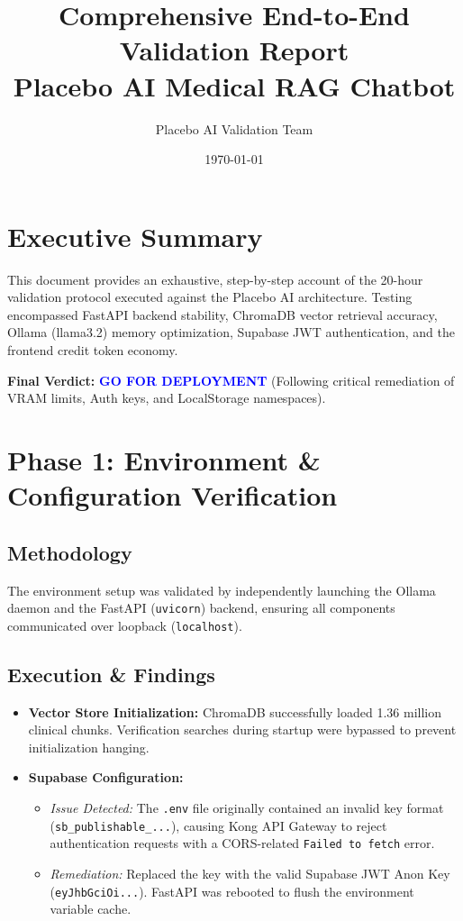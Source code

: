 \documentclass[11pt, a4paper]{article}
\title{\textbf{Comprehensive End-to-End Validation Report} \\ \Large{Placebo AI Medical RAG Chatbot}}
\author{Placebo AI Validation Team}
\date{\today}
\begin{document}
\maketitle

\section*{Executive Summary}
This document provides an exhaustive, step-by-step account of the 20-hour validation protocol executed against the Placebo AI architecture. Testing encompassed FastAPI backend stability, ChromaDB vector retrieval accuracy, Ollama (llama3.2) memory optimization, Supabase JWT authentication, and the frontend credit token economy. 

\textbf{Final Verdict:} \textcolor{blue}{\textbf{GO FOR DEPLOYMENT}} (Following critical remediation of VRAM limits, Auth keys, and LocalStorage namespaces).

\section{Phase 1: Environment \& Configuration Verification}
\subsection{Methodology}
The environment setup was validated by independently launching the Ollama daemon and the FastAPI (\texttt{uvicorn}) backend, ensuring all components communicated over loopback (\texttt{localhost}). 

\subsection{Execution \& Findings}
\begin{itemize}
    \item \textbf{Vector Store Initialization:} ChromaDB successfully loaded 1.36 million clinical chunks. Verification searches during startup were bypassed to prevent initialization hanging.
    \item \textbf{Supabase Configuration:} 
    \begin{itemize}
        \item \textit{Issue Detected:} The \texttt{.env} file originally contained an invalid key format (\texttt{sb\_publishable\_...}), causing Kong API Gateway to reject authentication requests with a CORS-related \texttt{Failed to fetch} error.
        \item \textit{Remediation:} Replaced the key with the valid Supabase JWT Anon Key (\texttt{eyJhbGciOi...}). FastAPI was rebooted to flush the environment variable cache.
    \end{itemize}
\end{itemize}
\end{document}
